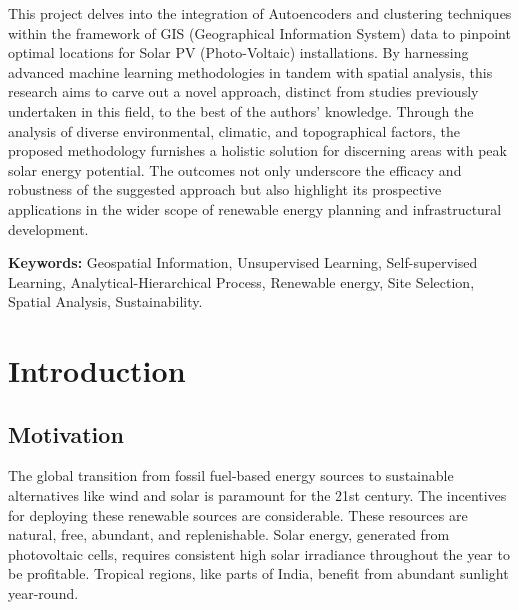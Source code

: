 \documentclass[a4paper,12pt]{Classes/RoboticsLaTeX}
\begin{document}
	
	\begin{abstracts}
		This project delves into the integration of Autoencoders and clustering techniques within the framework of GIS (Geographical Information System) 
		data to pinpoint optimal locations for Solar PV (Photo-Voltaic) installations. By harnessing advanced machine learning methodologies in tandem with 
		spatial analysis, this research aims to carve out a novel approach, distinct from studies previously undertaken in this field, to the best of the authors' 
		knowledge. Through the analysis of diverse environmental, climatic, and topographical factors, the proposed methodology furnishes a holistic solution for 
		discerning areas with peak solar energy potential. The outcomes not only underscore the efficacy and robustness of the suggested approach but also highlight 
		its prospective applications in the wider scope of renewable energy planning and infrastructural development.
		
		\textbf{Keywords: } Geospatial Information, Unsupervised Learning, Self-supervised
		Learning, Analytical-Hierarchical Process, Renewable energy, Site Selection,
		Spatial Analysis, Sustainability.
	\end{abstracts}
	
	
	\tableofcontents
	\listoffigures
	\listoftables

	



	\printglossary[title=List of Acronyms,type=\acronymtype]
	
	
	\mainmatter
	
	
	\chapter{Introduction}
	\label{chap:introduction}

	\section{Motivation}
	

	The global transition from fossil fuel-based energy sources to sustainable alternatives like wind and solar is paramount for the 21st century. 
	The incentives for deploying these renewable sources are considerable. These resources are natural, free, abundant, and replenishable. Solar energy, 
	generated from photovoltaic cells, requires consistent high solar irradiance throughout the year to be profitable. Tropical regions, like parts of India, 
	benefit from abundant sunlight year-round.
\end{document}

